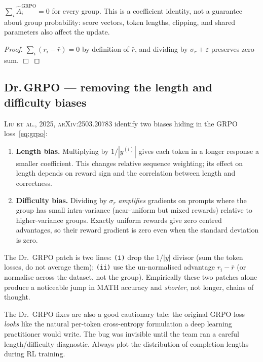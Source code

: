 \documentclass[11pt,oneside]{scrbook}
\begin{document}
\begin{theorem}
$\sum_i \hat A_i^{\text{GRPO}} = 0$ for every group. This is a coefficient identity, not a guarantee about group probability:
score vectors, token lengths, clipping, and shared parameters also affect the update.
\end{theorem}

\begin{proof}
$\sum_i (r_i - \bar r) = 0$ by definition of $\bar r$, and dividing by
$\sigma_r + \varepsilon$ preserves zero sum. $\Box$
\end{proof}

\subsection*{Dr.\,GRPO --- removing the length and difficulty biases}

\textsc{Liu et al., 2025, arXiv:2503.20783} identify two biases hiding in
the GRPO loss~\eqref{eq:grpo}:

\begin{enumerate}\setlength{\itemsep}{2pt}
  \item \textbf{Length bias.} Multiplying by $1/|y^{(i)}|$ gives each token in a longer response a smaller coefficient. This changes relative sequence weighting; its effect on length depends on reward sign and the correlation between length and correctness.
  \item \textbf{Difficulty bias.} Dividing by $\sigma_r$ \emph{amplifies}
        gradients on prompts where the group has small intra-variance
        (near-uniform but mixed rewards) relative to higher-variance groups.
        Exactly uniform rewards give zero centred advantages, so their reward
        gradient is zero even when the standard deviation is zero.
\end{enumerate}

The Dr.~GRPO patch is two lines: \texttt{(i)} drop the $1/|y|$ divisor (sum
the token losses, do not average them); \texttt{(ii)} use the un-normalised
advantage $r_i - \bar r$ (or normalise across the dataset, not the group).
Empirically these two patches alone produce a noticeable jump in MATH
accuracy and \emph{shorter}, not longer, chains of thought.

\begin{pitfall}
The Dr.~GRPO fixes are also a good cautionary tale: the original GRPO loss
\emph{looks} like the natural per-token cross-entropy formulation a deep
learning practitioner would write. The bug was invisible until the team
ran a careful length/difficulty diagnostic. Always plot the distribution
of completion lengths during RL training.
\end{pitfall}
\end{document}

